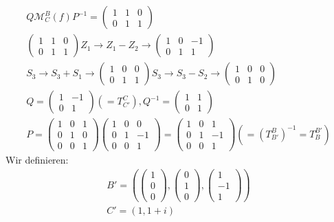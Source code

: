 \begin{align}
Q \mathcal{M}_{C}^{B} (f) P^{-1} = \begin{pmatrix}1 & 1 & 0 \\ 0 & 1 & 1\end{pmatrix} \\
\begin{pmatrix} 1 & 1 & 0 \\ 0 & 1 & 1 \end{pmatrix} Z_1 \rightarrow Z_1 - Z_2 \longrightarrow 
\begin{pmatrix}1 & 0 & -1 \\ 0 & 1 & 1\end{pmatrix} \\
S_3 \rightarrow S_3 + S_1 \longrightarrow \begin{pmatrix}1 & 0 & 0 \\ 0 & 1 & 1\end{pmatrix} 
S_3 \rightarrow S_3 - S_2 \longrightarrow \begin{pmatrix}1 & 0 & 0 \\ 0 & 1 & 0\end{pmatrix} \\
Q = \begin{pmatrix}1 & -1 \\ 0 & 1 \end{pmatrix} (= T_{C'}^{C}), Q^{-1} = \begin{pmatrix}1 & 1 \\ 0 & 1 \end{pmatrix} \\
P = \begin{pmatrix}1 & 0 & 1 \\ 0 & 1 & 0 \\ 0 & 0 & 1 \end{pmatrix} \begin{pmatrix}1 & 0 & 0 \\ 0 & 1 & -1 \\ 0 & 0 & 1 \end{pmatrix} = \begin{pmatrix}1 & 0 & 1 \\ 0 & 1 & -1 \\ 0 & 0 & 1 \end{pmatrix} (= (T_{B'}^{B})^{-1} = T_{B}^{B'})
\end{align}
Wir definieren:
\begin{align}
B' = (\begin{pmatrix}1 \\ 0 \\ 0\end{pmatrix}, \begin{pmatrix}0 \\ 1 \\ 0\end{pmatrix}, \begin{pmatrix}1 \\ -1 \\ 1\end{pmatrix}) \\
C' = (1, 1+i)
\end{align}
